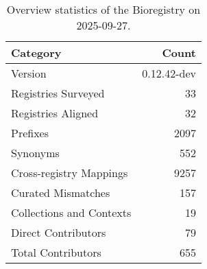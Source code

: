 \begin{table}
\caption{Overview statistics of the Bioregistry on 2025-09-27.}
\label{tab:bioregistry-summary}
\begin{tabular}{lr}
\toprule
Category & Count \\
\midrule
Version & 0.12.42-dev \\
Registries Surveyed & 33 \\
Registries Aligned & 32 \\
Prefixes & 2097 \\
Synonyms & 552 \\
Cross-registry Mappings & 9257 \\
Curated Mismatches & 157 \\
Collections and Contexts & 19 \\
Direct Contributors & 79 \\
Total Contributors & 655 \\
\bottomrule
\end{tabular}
\end{table}
